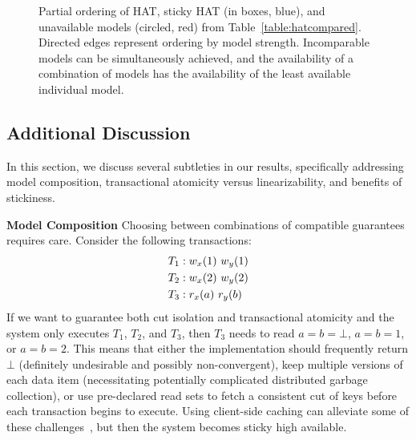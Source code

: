 \begin{figure}[t!]
\label{fig:hat-order}
\caption{Partial ordering of HAT, sticky HAT (in boxes, blue), and
  unavailable models (circled, red) from
  Table~\protect\ref{table:hatcompared}. Directed edges represent
  ordering by model strength. Incomparable models can be
  simultaneously achieved, and the availability of a combination of
  models has the availability of the least available individual
  model.}\vspace{-1em}
\label{fig:hatcompared}
\end{figure}


\subsection{Additional Discussion}
\label{sec:discussion}

In this section, we discuss several subtleties in our results,
specifically addressing model composition, transactional atomicity
versus linearizability, and benefits of stickiness.

\vspace{.5em}\noindent\textbf{Model Composition} Choosing between
combinations of compatible guarantees requires care. Consider the
following transactions:
\begin{align*}
\small\vspace{-1em}
T_1 &: w_x(1)~w_y(1)
\\T_2 &: w_x(2)~w_y(2)
\\T_3 &: r_x(a)~r_y(b)\vspace{-1em}
\end{align*}
If we want to guarantee both cut isolation and transactional atomicity
and the system only executes $T_1$, $T_2$, and $T_3$, then $T_3$ needs
to read $a=b=\bot$, $a=b=1$, or $a=b=2$. This means that either the
implementation should frequently return $\bot$ (definitely undesirable
and possibly non-convergent), keep multiple versions of each data item
(necessitating potentially complicated distributed garbage
collection), or use pre-declared read sets to fetch a consistent cut
of keys before each transaction begins to execute. Using client-side
caching can alleviate some of these challenges~\cite{bolton, swift},
but then the system becomes sticky high available.

